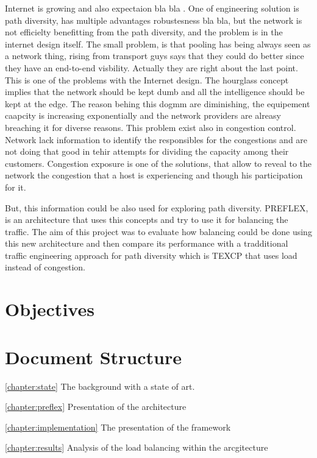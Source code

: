 Internet is growing and also expectaion bla bla . One of  engineering solution is path diversity, has multiple advantages robustesness bla bla, but the network is not efficielty benefitting from the path diversity, and the problem is in the internet design itself. The small problem, is that pooling has being always seen as a network thing, rising from transport guys says that they could do better since they have an end-to-end visbility. Actually they are right about the last point. This is one of the problems with the Internet design. The hourglass concept implies that the network should be kept dumb and all the intelligence should be kept at the edge. The reason behing this dogmm are diminishing, the equipement caapcity is increasing exponentially and the network providers are alreasy breaching it for diverse reasons. This problem exist also in congestion control. Network lack  information to identify the responsibles for the congestions and are not doing that good in tehir attempts for dividing the capacity among their customers. Congestion exposure is one of the solutions, that allow to reveal to the network the congestion that a host is experiencing and though his participation for it.

But, this information could be also used for exploring path diversity. PREFLEX, is an architecture that uses this concepts and try to use it for balancing the traffic. The aim of this project was to evaluate how balancing could be done using this new architecture and then compare its performance with a tradditional traffic engineering approach for path diversity which is TEXCP that uses load instead of congestion.

\section{Objectives}
\section{Document Structure}

\ref{chapter:state}
The background with a state of art.

\ref{chapter:preflex}
Presentation of the architecture

\ref{chapter:implementation}
The presentation of the framework

\ref{chapter:results}
Analysis of the load balancing within the arcgitecture